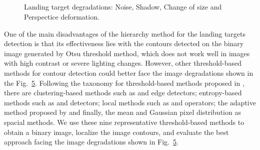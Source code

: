   
\begin{figure}[!ht]
    \centering
    \begin{subfigure}[b]{0.3\textwidth}
        \caption{}
        \label{fig:deg_noise}
    \end{subfigure}
        ~ %
    \begin{subfigure}[b]{0.3\textwidth}
        \caption{}
        \label{fig:deg_shadow}
    \end{subfigure}\\
        ~ %
    \begin{subfigure}[b]{0.3\textwidth}
        \caption{}
        \label{fig:deg_resolution}
    \end{subfigure}
        ~ %
    \begin{subfigure}[b]{0.3\textwidth}
        \caption{}
        \label{fig:deg_deformation}
    \end{subfigure}
    \caption{ Landing target degradations:  Noise,  Shadow,  Change of size and  Perspectice deformation.}\label{fig:tar_degradations}
\end{figure}


One of the main disadvantages of the hierarchy method for the landing targets detection is that its effectiveness lies with the contours detected on the binary image generated by Otsu threshold method, which does not work well in images with high contrast or severe lighting changes. However, other threshold-based methods for contour detection could better face the image degradations shown in the Fig.\ \ref{fig:tar_degradations}. Following the taxonomy for threshold-based methods proposed in \citep{Sezgin.Sankur:EI:2010}, there are clustering-based methods such as \cite{Otsu:SMC:1979} and \cite{Ridler.Calvard:TSMC:1978} edge detectors; entropy-based methods such as \cite{Yen.Chang.ea:TIP:1995} and \cite{Li.Lee:ICPR:1993} detectors; local methods such as \cite{Niblack:ImageProcc:1986} and \cite{Sauvola.Pietikainen:ICPR:2000} operators; the adaptive method proposed by \cite{Bradley.Roth:ACM:2007} and finally, the mean and Gaussian pixel distribution as spacial methods. We use these nine representative threshold-based methods to obtain a binary image, localize the image contours, and evaluate the best approach facing the image degradations shown in Fig.\ \ref{fig:tar_degradations}.



